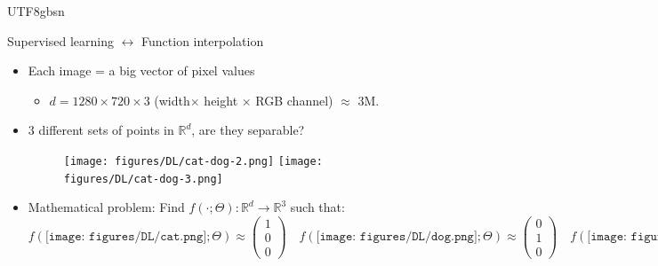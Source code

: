 \documentclass{beamer}
\begin{document}
\begin{CJK*}{UTF8}{gbsn}
\begin{frame}{Supervised learning $\leftrightarrow$ Function interpolation}
\begin{itemize}
\item Each image = a big vector of pixel values 
\begin{itemize}
	\item $d=1280\times720\times3$ (width$\times$ height $\times$ RGB channel) $\approx$ 3M. 
\end{itemize}
\pause 
\item 3 different sets of points in $\mathbb{R}^d$, are they separable?
\begin{figure}
	\begin{center}
		\texttt{[image: figures/DL/cat-dog-2.png]}   \quad \quad  \quad \quad 
		\texttt{[image: figures/DL/cat-dog-3.png]}  
	\end{center} 
\end{figure}
\pause 
\item Mathematical problem: Find $f(\cdot; \Theta): \mathbb{R}^d \to \mathbb{R}^3$ such that:
$$
f(\texttt{[image: figures/DL/cat.png]}; \Theta)
\approx \begin{pmatrix}
1\\ 0 \\ 0 
\end{pmatrix} 
\quad 
f(\texttt{[image: figures/DL/dog.png]}; \Theta)
\approx \begin{pmatrix}
0\\ 1 \\ 0 
\end{pmatrix} 
\quad 
f(\texttt{[image: figures/DL/rabbit.png]};
    \Theta) \approx 
\begin{pmatrix}
0\\ 0 \\ 1
\end{pmatrix} 
$$
\end{itemize}
\end{frame}


\end{CJK*}
\end{document}
